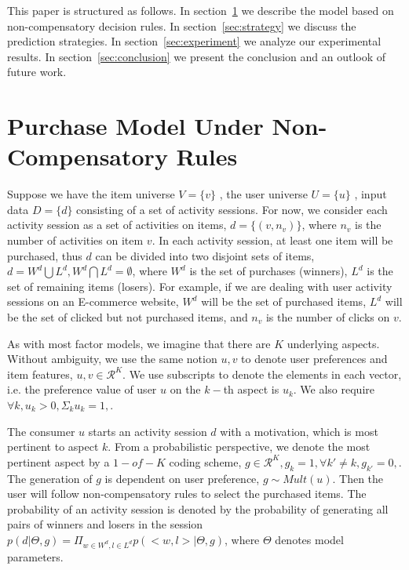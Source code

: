 \documentclass[sigconf]{acmart}
\begin{document}

This paper is structured as follows. In section~\ref{sec:model} we describe the model based on non-compensatory decision rules. In section~\ref{sec:strategy} we discuss the prediction strategies. In section~\ref{sec:experiment} we analyze our experimental results. In section~\ref{sec:conclusion} we present the conclusion and an outlook of future work.

\section{Purchase Model Under Non-Compensatory Rules}\label{sec:model}

Suppose we have the item universe $V=\{v\}$ , the user universe $U=\{u\}$ , input data $D=\{d\}$ consisting of a set of activity sessions. For now, we consider each activity session as a set of activities on items, $d=\{(v,n_v)\}$, where $n_v$ is the number of activities on item $v$.  In each activity session, at least one item will be purchased, thus $d$ can be divided into two disjoint sets of items, $d=W^d\bigcup L^d, W^d\bigcap L^d=\emptyset$, where $W^d$ is the set of purchases (winners), $L^d$ is the set of remaining items (losers). For example, if we are dealing with user activity sessions on an E-commerce website, $W^d$ will be the set of purchased items, $L^d$ will be the set of clicked but not purchased items, and $n_v$ is the number of clicks on $v$.


As with most factor models, we imagine that there are $K$ underlying aspects.  Without ambiguity, we use the same notion $u,v$ to denote user preferences and item features, $u,v\in \mathcal{R}^K$. We use subscripts to denote the elements in each vector, i.e. the preference value of user $u$ on the $k-$th aspect is $u_k$. We also require $\forall k, u_k>0, \Sigma_k u_k=1,$. 


The consumer $u$ starts an activity session $d$ with a motivation, which is most pertinent to aspect $k$. From a probabilistic perspective, we denote the most pertinent aspect by a $1-of-K$ coding scheme, $g\in \mathcal{R}^K, g_k=1,\forall k'\neq k, g_{k'}=0,$. The generation of $g$ is dependent on user preference, $g \sim Mult(u)$. Then the user will follow non-compensatory rules to select the purchased items. The probability of an activity session is denoted by the probability of generating all pairs of winners and losers in the session $p(d|\Theta, g)=\Pi_{w\in W^d, l \in L^d} p(<w,l>|\Theta,g)$, where $\Theta$ denotes model parameters. 
\end{document}

